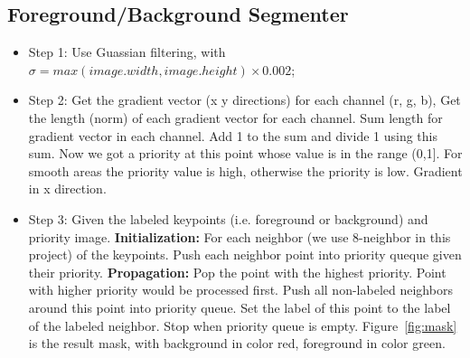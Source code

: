 \documentclass[letterpaper, 10 pt, conference]{ieeeconf}  %
\begin{document}
\subsection{Foreground/Background Segmenter}

\begin{itemize}
   \item Step 1: Use Guassian filtering, with $\sigma = max(image.width, image.height) \times 0.002$;
    \vspace{1em}
   \item Step 2: Get the gradient vector (x y directions) for each channel (r, g, b),
         Get the length (norm) of each gradient vector for each channel.
         Sum length for gradient vector in each channel.
         Add 1 to the sum and divide 1 using this sum.
         Now we got a priority at this point whose value is in the range (0,1].
         For smooth areas the priority value is high, otherwise the priority is low.
         Gradient in x direction.
   \vspace{1em}
   \item Step 3: Given the labeled keypoints (i.e. foreground or background) and priority image.
         \vspace{0.5em}\newline
         \textbf{Initialization:}
         For each neighbor (we use 8-neighbor in this project) of the keypoints.
         Push each neighbor point into priority queque given their priority.
         \vspace{0.5em}\newline
         \textbf{Propagation:}
         Pop the point with the highest priority.
         Point with higher priority would be processed first.
         Push all non-labeled neighbors around this point into priority queue.
         Set the label of this point to the label of the labeled neighbor.
         Stop when priority queue is empty.
         Figure~\ref{fig:mask} is the result mask, with background in color red, foreground in color green.
\end{itemize}
\end{document}

